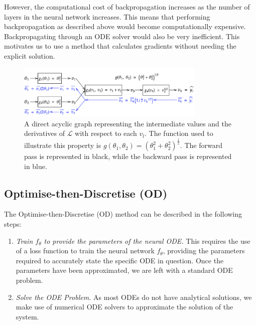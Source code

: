 \documentclass[a4paper,11pt,titlepage]{article}
\theoremstyle{definition}
\theoremstyle{plain}
\theoremstyle{remark}
\begin{document}

However, the computational cost of backpropagation increases as the number of layers in the neural network increases. This means that performing backpropagation as described above would become computationally expensive. Backpropagating through an ODE solver would also be very inefficient. This motivates us to use a method that calculates gradients without needing the explicit solution.

\begin{figure}\label{discretebackprop}
    \centering
    \includegraphics[width=0.8\textwidth]{report/figures/backpropdiscrete.png}
    \caption{A direct acyclic graph representing the intermediate values and the derivatives of $\mathcal{L}$ with respect to each $v_l$. The function used to illustrate this property is $g(\theta_1, \theta_2) = (\theta_1^2 + \theta_2^2)^\frac{1}{2}$. The forward pass is represented in black, while the backward pass is represented in blue.}
    \label{fig:discretebackprop}
\end{figure}

\subsection{Optimise-then-Discretise (OD)}
\label{sec:od}

The Optimise-then-Discretise (OD) method can be described in the following steps:
\begin{enumerate}
    \item \textit{Train $f_\theta$ to provide the parameters of the neural ODE.} This requires the use of a loss function to train the neural network $f_\theta$, providing the parameters required to accurately state the specific ODE in question. Once the parameters have been approximated, we are left with a standard ODE problem.
    \item \textit{Solve the ODE Problem.} As most ODEs do not have analytical solutions, we make use of numerical ODE solvers to approximate the solution of the system.
\end{enumerate}
\end{document}
